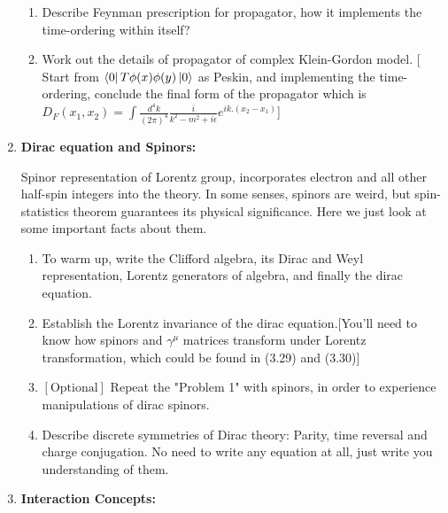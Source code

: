 \documentclass[11pt]{article}
\begin{document}
\begin{enumerate}
\begin{problem}{\points[2.4 Peskin]{-}}
\begin{enumerate}
			\item Describe Feynman prescription for propagator, how it implements the time-ordering within itself?
			
			\item Work out the details of propagator of complex Klein-Gordon model. [ Start from $\bra{0}T\phi(x)\phi(y)\ket{0}$ as Peskin, and implementing the time-ordering, conclude the final form of the propagator which is $D_F(x_1,x_2) = 
			\int \frac{d^4k}{(2\pi)^4} \frac{i}{k^2 -m^2 + i\epsilon} e^{ik.(x_2-x_1)}
			$]
		\end{enumerate}
		\end{problem}
	\item
	\begin{problem}{\points[Peskin Ch3]{-}}
		\textbf{Dirac equation and Spinors:}
		
		\noindent
		Spinor representation of Lorentz group, incorporates electron and all other half-spin integers into the theory. In some senses, spinors are weird, but spin-statistics theorem guarantees its physical significance. Here we just look at some important facts about them.

		\begin{enumerate}
			\item To warm up, write the Clifford algebra, its Dirac and Weyl representation, Lorentz generators of algebra, and finally the dirac equation.
			\item Establish the Lorentz invariance of the dirac equation.[You'll need to know how spinors and $\gamma^\mu$ matrices transform under Lorentz transformation, which could be found in (3.29) and (3.30)]
			\item $[\text{Optional}]$ Repeat the "Problem 1" with spinors, in order to experience manipulations of dirac spinors.
			\item Describe discrete symmetries of Dirac theory: Parity, time reversal and charge conjugation. No need to write any equation at all, just write you understanding of them.
			
		\end{enumerate}
	\end{problem}
	\item
		\begin{problem}{\points[Peskin Ch4]{-}}
			\textbf{Interaction Concepts:}
			

\end{problem}
\end{enumerate}
\end{document}

